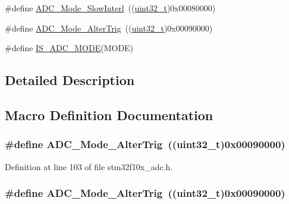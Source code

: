\begin{DoxyCompactItemize}
\item 
\#define \hyperlink{group___a_d_c__mode_ga8b81e27e98dbc3d1e31452dbad167cd5}{A\+D\+C\+\_\+\+Mode\+\_\+\+Slow\+Interl}~((\hyperlink{_p_e___types_8h_a33594304e786b158f3fb30289278f5af}{uint32\+\_\+t})0x00080000)
\item 
\#define \hyperlink{group___a_d_c__mode_ga5595f12dc485e301ba3bad0e165586c1}{A\+D\+C\+\_\+\+Mode\+\_\+\+Alter\+Trig}~((\hyperlink{_p_e___types_8h_a33594304e786b158f3fb30289278f5af}{uint32\+\_\+t})0x00090000)
\item 
\#define \hyperlink{group___a_d_c__mode_ga4abf4c7de28a42d7b124c9e403a6e537}{I\+S\+\_\+\+A\+D\+C\+\_\+\+M\+O\+DE}(M\+O\+DE)
\end{DoxyCompactItemize}


\subsection{Detailed Description}


\subsection{Macro Definition Documentation}
\subsubsection[{\texorpdfstring{A\+D\+C\+\_\+\+Mode\+\_\+\+Alter\+Trig}{ADC_Mode_AlterTrig}}]{\setlength{\rightskip}{0pt plus 5cm}\#define A\+D\+C\+\_\+\+Mode\+\_\+\+Alter\+Trig~(({\bf uint32\+\_\+t})0x00090000)}\hypertarget{group___a_d_c__mode_ga5595f12dc485e301ba3bad0e165586c1}{}\label{group___a_d_c__mode_ga5595f12dc485e301ba3bad0e165586c1}


Definition at line 103 of file stm32f10x\+\_\+adc.\+h.

\subsubsection[{\texorpdfstring{A\+D\+C\+\_\+\+Mode\+\_\+\+Alter\+Trig}{ADC_Mode_AlterTrig}}]{\setlength{\rightskip}{0pt plus 5cm}\#define A\+D\+C\+\_\+\+Mode\+\_\+\+Alter\+Trig~(({\bf uint32\+\_\+t})0x00090000)}\hypertarget{group___a_d_c__mode_ga5595f12dc485e301ba3bad0e165586c1}{}\label{group___a_d_c__mode_ga5595f12dc485e301ba3bad0e165586c1}


